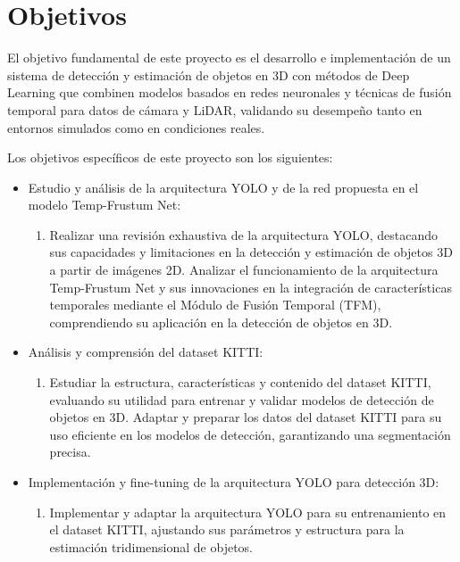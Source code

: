 \section{Objetivos}
\label{sec:objetivos-y-campo}


El objetivo fundamental de este proyecto es el desarrollo e implementación de un sistema de detección y estimación de objetos en 3D con métodos de Deep Learning que combinen modelos basados en redes neuronales y técnicas de fusión temporal para datos de cámara y LiDAR, validando su desempeño tanto en entornos simulados como en condiciones reales.


Los objetivos específicos de este proyecto son los siguientes:
\begin{itemize}
	\item Estudio y análisis de la arquitectura YOLO y de la red propuesta en el modelo Temp-Frustum Net:
	\begin{enumerate}
		\item Realizar una revisión exhaustiva de la arquitectura YOLO, destacando sus capacidades y limitaciones en la detección y estimación de objetos 3D a partir de imágenes 2D.
		Analizar el funcionamiento de la arquitectura Temp-Frustum Net y sus innovaciones en la integración de características temporales mediante el Módulo de Fusión Temporal (TFM), comprendiendo su aplicación en la detección de objetos en 3D.
	\end{enumerate}
	
	\item Análisis y comprensión del dataset KITTI:
	\begin{enumerate}
		\item Estudiar la estructura, características y contenido del dataset KITTI, evaluando su utilidad para entrenar y validar modelos de detección de objetos en 3D.
		Adaptar y preparar los datos del dataset KITTI para su uso eficiente en los modelos de detección, garantizando una segmentación precisa. 
	\end{enumerate}
	
	\item Implementación y fine-tuning de la arquitectura YOLO para detección 3D:
	\begin{enumerate}
		\item Implementar y adaptar la arquitectura YOLO para su entrenamiento en el dataset KITTI, ajustando sus parámetros y estructura para la estimación tridimensional de objetos.
	\end{enumerate}
	

\end{itemize}
